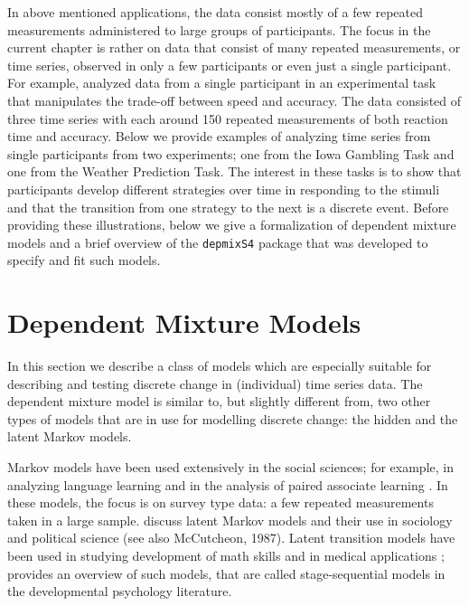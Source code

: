 \documentclass[a4paper,12pt,man,english]{apa} %
\newcommand{\citep}{\cite}
\newcommand{\citet}{\citeA}
\newcommand{\pkg}{\texttt}
\begin{document}
In above mentioned applications, the data consist mostly of a few
repeated measurements administered to large groups of participants.
The focus in the current chapter is rather on data that consist of
many repeated measurements, or time series, observed in only a few
participants or even just a single participant.  For example,
\citet{Visser2009} analyzed data from a single participant in an
experimental task that manipulates the trade-off between speed and
accuracy.  The data consisted of three time series with each around
150 repeated measurements of both reaction time and accuracy.  Below
we provide examples of analyzing time series from single participants
from two experiments; one from the Iowa Gambling Task and one from the
Weather Prediction Task.  The interest in these tasks is to show that
participants develop different strategies over time in responding to
the stimuli and that the transition from one strategy to the next is a
discrete event.  Before providing these illustrations, below we give a
formalization of dependent mixture models and a brief overview of the
\pkg{depmixS4} package that was developed to specify and fit such models.


\section{Dependent Mixture Models}

In this section we describe a class of models which are especially
suitable for describing and testing discrete change in (individual)
time series data.  The dependent mixture model is similar to, but
slightly different from, two other types of models that are in use for
modelling discrete change: the hidden and the latent Markov models.

Markov models have been used extensively in the social sciences; for
example, in analyzing language learning \cite{Miller1952,Miller1963} and
in the analysis of paired associate learning \cite{Wickens1982}.  In
these models, the focus is on survey type data: a few repeated
measurements taken in a large sample.   discuss
latent Markov models and their use in sociology and political science
(see also McCutcheon, 1987).  Latent transition models have been used
in studying development of math skills \citep{Collins1992} and in
medical applications \citep{Reboussin1998}; \citet{Kaplan2008}
provides an overview of such models, that are called stage-sequential
models in the developmental psychology literature.
\end{document}
